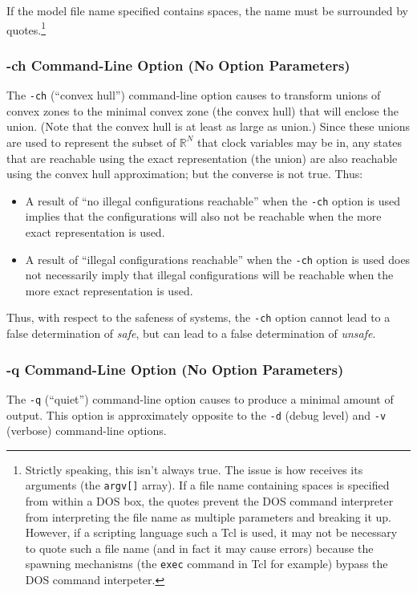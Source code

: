 If the model file name specified contains spaces, the name must be
surrounded by quotes.\footnote{Strictly speaking, this isn't always true.
The issue is how \swname{} receives its arguments (the \texttt{argv[]} 
array).  If a file name containing spaces is specified from within a DOS
box, the quotes prevent the DOS command interpreter from interpreting the
file name as multiple parameters and breaking it up.  However, if a
scripting language such a Tcl is used, it may not be necessary to quote
such a file name (and in fact it may cause errors) because the 
spawning mechanisms (the \texttt{exec} command in Tcl for example) 
bypass the DOS command interpeter.}

\subsubsection{-ch Command-Line Option (No Option Parameters)}
The \texttt{-ch} (``convex hull'') command-line 
option causes \swname{} to transform unions of convex zones to
the minimal convex zone (the convex hull) 
that will enclose the union.  
(Note that the convex hull is at least as large as union.)
Since these 
unions are used to represent the subset of $\mathbb{R}^N$ that 
clock variables may be in, any states that are reachable using the exact
representation (the union) are also reachable using the convex hull 
approximation; but the converse is not true.  Thus:

\begin{itemize}
\item A result of ``no illegal configurations reachable'' when the 
      \texttt{-ch} option is used implies that the configurations will also
      not be reachable when the more exact representation is used.
\item A result of ``illegal configurations reachable'' when the 
      \texttt{-ch} option is used does not necessarily imply that 
      illegal configurations will be reachable when the more exact
      representation is used.
\end{itemize}

Thus, with respect to the safeness of systems, the \texttt{-ch}
option cannot lead to a false determination of \emph{safe}, but
can lead to a false determination of \emph{unsafe}.

\subsubsection{-q Command-Line Option (No Option Parameters)}
The \texttt{-q} (``quiet'') command-line option causes \swname{}
to produce a minimal amount of output.  This option is approximately opposite
to the \texttt{-d} (debug level) and \texttt{-v} (verbose)
command-line options.

